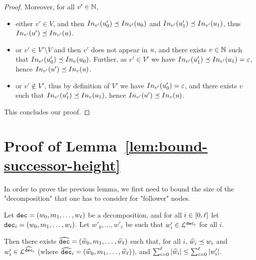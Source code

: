 \begin{proof}
	Moreover, for all $v' \in \mathbb{N}$, 
	\begin{itemize}
		\item either $v'\in V$, and then $\vinput{v'}{\localrun_0'} \subword \vinput{v'}{\localrun_0}$ and $\vinput{v'}{\localrun_1'} \subword \vinput{v'}{\localrun_1}$, thus $\vinput{v'}{\localrun'} \subword \vinput{v'}{\localrun}$.
		
		\item or $v' \in V' \setminus V$ and then $v'$ does not appear in $u$, and there exists $v \in \mathbb{N}$ such that $\vinput{v'}{\localrun_0'} \subword \vinput{v}{\localrun_0}$. Further, as $v' \in V'$ we have $\vinput{v'}{\localrun_1'} \subword \vinput{v'}{\localrun_1} = \epsilon$, hence $\vinput{v'}{\localrun'} \subword \vinput{v}{\localrun}$.
		
		\item or $v' \notin V'$, thus by definition of $V'$ we have $\vinput{v'}{\localrun_0'} = \epsilon$, and there exists $v$ such that $\vinput{v'}{\localrun_1'} \subword \vinput{v}{\localrun_1}$, hence $\vinput{v'}{\localrun'} \subword \vinput{v}{\localrun}$.
	\end{itemize}
	This concludes our proof.
\end{proof}

\section{Proof of Lemma~\ref{lem:bound-successor-height}}
\lemBoundSuccessorHeight*

In order to prove the previous lemma, we first need to bound the size of the "decomposition" that one has to consider for "follower" nodes. 
\begin{lemma}
	\label{lem:short-dec}
	Let $\mathtt{dec} = (w_0, m_1, \ldots, w_\ell)$ be a decomposition, and for all $i\in [0,\ell]$ let $\mathtt{dec}_i = (w_0, m_1, \ldots, w_i)$.
	Let $w'_0, \ldots, w'_\ell$ be such that $w'_i \in \mathcal{L}^{\mathtt{\mathtt{dec}_i}}$ for all $i$.
	
	Then there exists $\widehat{\mathtt{dec}} = (\widehat{w}_0, m_1, \ldots, \widehat{w}_\ell)$ such that, for all $i$, $\widehat{w}_i \preceq w_i$ and $w'_i \in \mathcal{L}^{\mathtt{\widehat{\mathtt{dec}}_i}}$ (where $\widehat{\mathtt{dec}}_i = (\widehat{w}_0, m_1, \ldots, \widehat{w}_\ell)$), and $\sum_{i=0}^{\ell} |\widehat{w}_i| \leq \sum_{i=0}^{\ell} |w'_i|$. 
\end{lemma}

